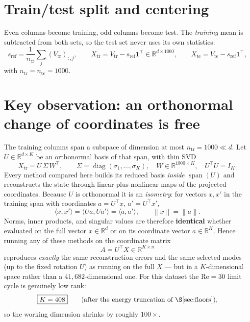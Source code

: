 \documentclass[11pt]{article}
\newcommand{\R}{\mathbb{R}}
\newcommand{\Xtr}{X_{\mathrm{tr}}}
\newcommand{\Xte}{X_{\mathrm{te}}}
\newcommand{\Vtr}{V_{\mathrm{tr}}}
\newcommand{\Vte}{V_{\mathrm{te}}}
\newcommand{\sref}{s_{\mathrm{ref}}}
\newcommand{\norm}[1]{\left\lVert#1\right\rVert}
\DeclareMathOperator{\spanop}{span}
\DeclareMathOperator{\diag}{diag}
\begin{document}
\section{Train/test split and centering}
Even columns become training, odd columns become test. The \emph{training} mean
is subtracted from both sets, so the test set never uses its own statistics:
\begin{equation}
\sref = \frac{1}{n_{\mathrm{tr}}}\sum_{j}(\Vtr)_{:,j},\qquad
\Xtr = \Vtr - \sref\mathbf 1^\top \in \R^{d\times 1000},\qquad
\Xte = \Vte - \sref\mathbf 1^\top,
\end{equation}
with $n_{\mathrm{tr}}=n_{\mathrm{te}}=1000$.

\section{Key observation: an orthonormal change of coordinates is free}
The training columns span a subspace of dimension at most $n_{\mathrm{tr}}=1000\ll d$.
Let $U\in\R^{d\times K}$ be an orthonormal basis of that span, with thin SVD
\begin{equation}
\Xtr = U\,\Sigma\,W^\top,\qquad
\Sigma=\diag(\sigma_1,\dots,\sigma_K),\quad
W\in\R^{1000\times K},\quad U^\top U = I_K .
\end{equation}
Every method compared here builds its reduced basis \emph{inside} $\spanop(U)$ and
reconstructs the state through linear-plus-nonlinear maps of the projected
coordinates. Because $U$ is orthonormal it is an \emph{isometry}: for vectors
$x,x'$ in the training span with coordinates $a=U^\top x$, $a'=U^\top x'$,
\begin{equation}
\langle x,x'\rangle = \langle Ua,Ua'\rangle = \langle a,a'\rangle,
\qquad \norm{x}=\norm{a}.
\end{equation}
Norms, inner products, and singular values are therefore \textbf{identical}
whether evaluated on the full vector $x\in\R^{d}$ or on its coordinate vector
$a\in\R^{K}$. Hence running any of these methods on the coordinate matrix
\begin{equation}
A = U^\top X \in \R^{K\times n}
\end{equation}
reproduces \emph{exactly} the same reconstruction errors and the same selected
modes (up to the fixed rotation $U$) as running on the full $X$ --- but in a
$K$-dimensional space rather than a $41{,}682$-dimensional one. For this dataset
the $\mathrm{Re}=30$ limit cycle is genuinely low rank:
\begin{equation}
\boxed{K = 408}\qquad\text{(after the energy truncation of \S\ref{sec:floors})},
\end{equation}
so the working dimension shrinks by roughly $100\times$.
\end{document}
